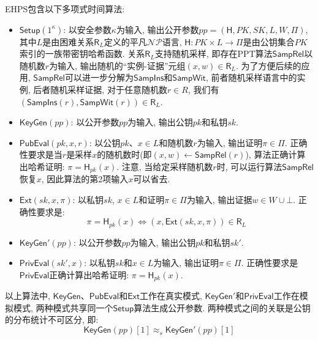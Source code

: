 \begin{definition}[可提取哈希证明系统]
EHPS包含以下多项式时间算法:
\begin{itemize}
\item $\mathsf{Setup}(1^\kappa)$: 以安全参数$\kappa$为输入, 输出公开参数$pp = (\mathsf{H}, PK, SK, L, W, \Pi)$, 
	其中$L$是由困难关系$\mathsf{R}_L$定义的平凡$\mathcal{NP}$语言, 
	$\mathsf{H}: PK \times L \rightarrow \Pi$是由公钥集合$PK$索引的一族带密钥哈希函数. 
	关系$\mathsf{R}_L$支持随机采样, 即存在PPT算法$\mathsf{SampRel}$以随机数$r$为输入, 输出随机的``实例-证据''元组$(x, w) \in \mathsf{R}_L$.  
	为了方便后续的应用, $\mathsf{SampRel}$可以进一步分解为$\mathsf{SampIns}$和$\mathsf{SampWit}$, 前者随机采样语言中的实例, 后者随机采样证据, 
	对于任意随机数$r \in R$, 我们有$(\mathsf{SampIns}(r), \mathsf{SampWit}(r)) \in \mathsf{R}_L$. 

\item $\mathsf{KeyGen}(pp)$: 以公开参数$pp$为输入, 输出公钥$pk$和私钥$sk$. 

\item $\mathsf{PubEval}(pk, x, r)$: 以公钥$pk$、$x \in L$和随机数$r$为输入, 输出证明$\pi \in \Pi$. 
	正确性要求是当$r$是采样$x$的随机数时(即$(x, w) \leftarrow \mathsf{SampRel}(r)$), 算法正确计算出哈希证明: $\pi = \mathsf{H}_{pk}(x)$. 
	注意, 当给定采样随机数$r$时, 可以运行算法$\mathsf{SampRel}$恢复$x$, 因此算法的第2项输入$x$可以省去.   

\item $\mathsf{Ext}(sk, x, \pi)$: 以私钥$sk$, $x \in L$和证明$\pi \in \Pi$为输入, 输出证据$w \in W \cup \bot$. 
	正确性要求是: 
	\begin{equation*}
		\pi = \mathsf{H}_{pk}(x) \iff (x, \mathsf{Ext}(sk, x, \pi)) \in \mathsf{R}_L
	\end{equation*}

\item $\mathsf{KeyGen}'(pp)$: 以公开参数$pp$为输入, 输出公钥$pk$和私钥$sk'$. 

\item $\mathsf{PrivEval}(sk', x)$: 以私钥$sk$和$x \in L$为输入, 输出证明$\pi \in \Pi$. 
	正确性要求是$\mathsf{PrivEval}$正确计算出哈希证明: $\pi = \mathsf{H}_{pk}(x)$. 
\end{itemize}
以上算法中, $\mathsf{KeyGen}$、$\mathsf{PubEval}$和$\mathsf{Ext}$工作在真实模式, 
$\mathsf{KeyGen}'$和$\mathsf{PrivEval}$工作在模拟模式, 两种模式共享同一个$\mathsf{Setup}$算法生成公开参数. 
两种模式之间的关联是公钥的分布统计不可区分, 即: 
\begin{equation*}
	\mathsf{KeyGen}(pp)[1] \approx_s \mathsf{KeyGen}'(pp)[1]
\end{equation*}
\end{definition}

